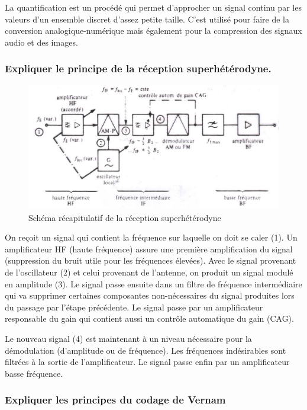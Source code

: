 La quantification est un procédé qui permet d'approcher un signal continu par les valeurs d'un ensemble discret d'assez petite taille.  C'est utilisé pour faire de la conversion analogique-numérique mais également pour la compression des signaux audio et des images.  

\subsubsection{Expliquer le principe de la réception superhétérodyne.}

\begin{figure}[H]
    \centering
    \includegraphics[width=\linewidth]{img/reception_superheterodyne.png}
    \caption{Schéma récapitulatif de la réception superhétérodyne}
\end{figure}

On reçoit un signal qui contient la fréquence sur laquelle on doit se caler (1). Un amplificateur HF (haute fréquence) assure une première amplification du signal (suppression du bruit utile pour les fréquences élevées). Avec le signal provenant de l'oscillateur (2) et celui provenant de l'antenne, on produit un signal modulé en amplitude (3). Le signal passe ensuite dans un filtre de fréquence intermédiaire qui va supprimer certaines composantes non-nécessaires du signal produites lors du passage par l'étape précédente. Le signal passe par un amplificateur responsable du gain qui contient aussi un contrôle automatique du gain (CAG).

Le nouveau signal (4) est maintenant à un niveau nécessaire pour la démodulation (d'amplitude ou de fréquence). Les fréquences indésirables sont filtrées à la sortie de l'amplificateur. Le signal passe enfin par un amplificateur basse fréquence.

\subsubsection{Expliquer les principes du codage de Vernam}

